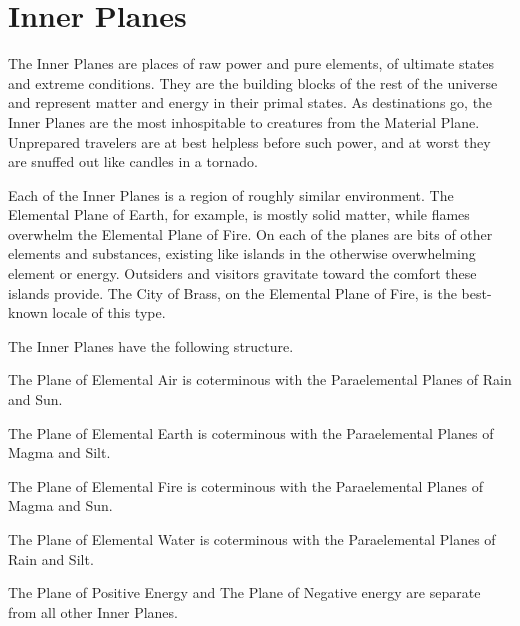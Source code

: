 \section{Inner Planes}
The Inner Planes are places of raw power and pure elements, of ultimate states and extreme conditions. They are the building blocks of the rest of the universe and represent matter and energy in their primal states. As destinations go, the Inner Planes are the most inhospitable to creatures from the Material Plane. Unprepared travelers are at best helpless before such power, and at worst they are snuffed out like candles in a tornado.

Each of the Inner Planes is a region of roughly similar environment. The Elemental Plane of Earth, for example, is mostly solid matter, while flames overwhelm the Elemental Plane of Fire. On each of the planes are bits of other elements and substances, existing like islands in the otherwise overwhelming element or energy. Outsiders and visitors gravitate toward the comfort these islands provide. The City of Brass, on the Elemental Plane of Fire, is the best-known locale of this type.

The Inner Planes have the following structure.

The Plane of Elemental Air is coterminous with the Paraelemental Planes of Rain and Sun.

The Plane of Elemental Earth is coterminous with the Paraelemental Planes of Magma and Silt.

The Plane of Elemental Fire is coterminous with the Paraelemental Planes of Magma and Sun.

The Plane of Elemental Water is coterminous with the Paraelemental Planes of Rain and Silt.

The Plane of Positive Energy and The Plane of Negative energy are separate from all other Inner Planes.

